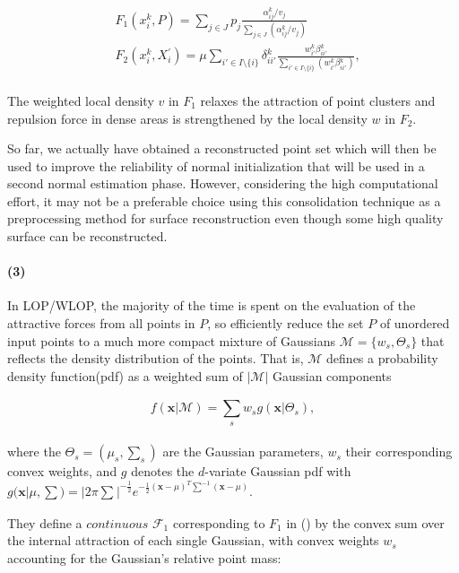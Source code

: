 \small{
\begin{equation}
 \label{eq:WLOP1}
 \begin{split}
 & F_1(x{_i^k},P)=\sum_{j\in J}^{}p_{j}\frac{\alpha{_{ij}^k}/v_{j}}{\sum_{j\in J}^{}(\alpha{_{ij}^k}/v_{j})}\\
 & F_2(x{_i^k},X{_i^{'}})=\mu\sum_{{i'}\in I\setminus\{i\}}^{}\delta{_{ii'}^k}\frac{w{_{i'}^k}\beta{_{ii'}^k}}{\sum_{{i'}\in I\setminus\{i\}}^{}(w{_{i'}^k}\beta{_{ii'}^k})},
 \end{split}
\end{equation}
}
\\
The weighted local density $v$ in $F_1$ relaxes the attraction of point clusters and repulsion force in dense areas is strengthened by the local density $w$ in $F_2$.

So far, we actually have obtained a reconstructed point set which will then be used to improve the reliability of normal initialization that will be used in a second normal estimation phase.
However, considering the high computational effort, it may not be a preferable choice using this consolidation technique as a preprocessing method for surface reconstruction even though some high quality surface can be reconstructed.


\paragraph{(3)}
In LOP/WLOP, the majority of the time is spent on the evaluation of the attractive forces from all points in $P$,
so \cite{preiner2014CPF} efficiently reduce the set $P$ of unordered input points to a much more compact mixture of Gaussians $\mathcal{M}=\{w_{s},\Theta_{s}\}$ that reflects the density distribution of the points.
That is, $\mathcal{M}$ defines a probability density function(pdf) as a weighted sum of $|\mathcal{M}|$ Gaussian components

\small{
\begin{equation}
 \label{eq:CLOP1}
 f(\mathbf{x}|\mathcal{M})=\sum_{s}^{}w_{s}g(\mathbf{x}|\Theta_{s}),
\end{equation}
}
\\
where the $\Theta_{s}=(\mu_{s},\sum_{s}^{})$ are the Gaussian parameters, $w_{s}$ their corresponding convex weights, and $g$ denotes the $d$-variate Gaussian pdf with $g(\mathbf{x}|\mu,\sum)=|2\pi\sum_{}^{}|^{-\frac{1}{2}}e^{-\frac{1}{2}(\mathbf{x}-\mu)^{T}\sum_{}^{-1}(\mathbf{x}-\mu)}$.

They define a $continuous$ $\mathcal{F}_1$ corresponding to $F_1$ in () by the convex sum over the internal attraction of each single Gaussian, with convex weights $w_s$ accounting for the Gaussian's relative point mass:

